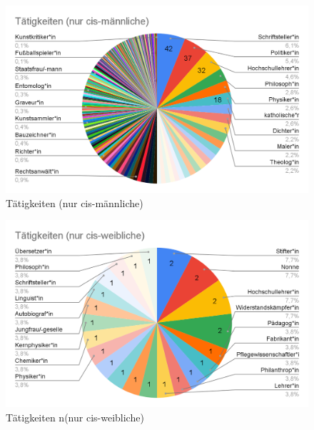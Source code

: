 \documentclass[ngerman,twocolumn,showpacs,%
  nofootinbib,aps,superscriptaddress,%
  eqsecnum,prd,notitlepage,showkeys,10pt,report]{revtex4-2}
\begin{document}
\begin{figure}
\centering
\includegraphics[width=1\linewidth]{7.png}
\caption{Tätigkeiten (nur cis-männliche)}
\label{fig:JobsOnlyMale}
\end{figure}
\begin{figure}
\centering
\includegraphics[width=1\linewidth]{8.png}
\caption{Tätigkeiten n(nur cis-weibliche)}
\label{fig:JobsOnlyFemale}
\end{figure}
\end{document}
